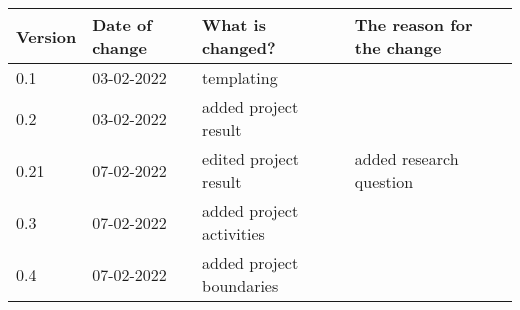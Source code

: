 \begin{tabular}{ | l | l | l | l |}
    \hline
    \textbf{Version} & \textbf{Date of change} & \textbf{What is changed?} & \textbf{The reason for the change} \\ \hline
    0.1 & 03-02-2022 & templating & \\
    0.2 & 03-02-2022 & added project result & \\
    0.21 & 07-02-2022 & edited project result & added research question\\
    0.3 & 07-02-2022 & added project activities &\\
    0.4 & 07-02-2022 & added project boundaries &\\
    \hline
\end{tabular}